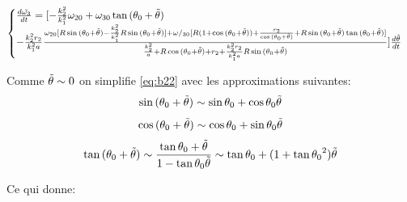 \begin{equation}
\begin{cases}
    \frac{d\Tilde{\omega_3}}{dt}=[-\frac{k_2^2}{k_1^2}\omega_{20}+\omega_{30}\tan{(\theta_0+\Tilde{\theta})}\\
    -\frac{k_2^2 r_2}{k_1^2 a}\frac{\omega_{20}[R\sin{(\theta_0+\Tilde{\theta})}-\frac{k_2^2}{k_1^2}R\sin{(\theta_0+\Tilde{\theta})}]+\omega/_{30}[R(1+\cos{(\theta_0+\Tilde{\theta})})+\frac{r_2}{\cos{(\theta_0+\Tilde{\theta})}}+R\sin{(\theta_0+\Tilde{\theta})}\tan{(\theta_0+\Tilde{\theta})}]}{\frac{k_2^2}{a}+R\cos{(\theta_0+\Tilde{\theta})}+r_2+\frac{k_2^2 r_2}{k_1^2 a}R\sin{(\theta_0+\Tilde{\theta})}}]\frac{d\Tilde{\theta}}{dt}
  \end{cases}
  \label{eq:b22}
\end{equation}

Comme $\Tilde{\theta} \sim 0$ on simplifie \ref{eq:b22} avec les approximations suivantes:
$$
\sin{(\theta_0+\Tilde{\theta})} \sim \sin{\theta_0}+\cos{\theta_0}\Tilde{\theta} 
$$
$$
\cos{(\theta_0+\Tilde{\theta})} \sim \cos{\theta_0}+\sin{\theta_0}\Tilde{\theta} \\
$$
$$
\tan{(\theta_0+\Tilde{\theta})} \sim \frac{\tan{\theta_0}+\Tilde{\theta}}{1-\tan{\theta_0}\Tilde{\theta}} \sim \tan{\theta_0}+(1+\tan{\theta_0}^2)\Tilde{\theta} $$ 


Ce qui donne:

